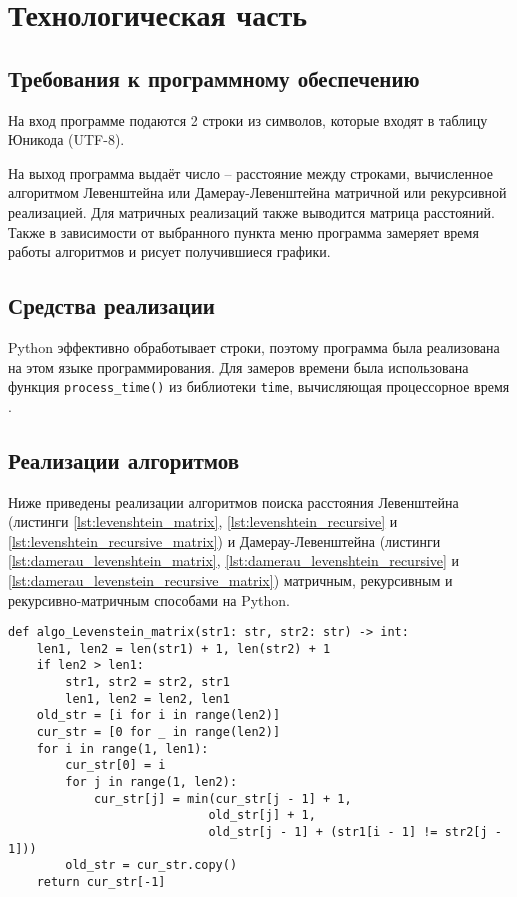 \section{Технологическая часть}
\subsection{Требования к программному обеспечению}

\hspace{1.25cm}
На вход программе подаются 2 строки из символов, которые входят в таблицу Юникода (UTF-8).

На выход программа выдаёт число – расстояние между строками, вычисленное алгоритмом Левенштейна или Дамерау-Левенштейна матричной или рекурсивной реализацией. Для матричных реализаций также выводится матрица расстояний. Также в зависимости от выбранного пункта меню программа замеряет время работы алгоритмов и рисует получившиеся графики.

\subsection{Средства реализации}

\hspace{1.25cm}
Python эффективно обработывает строки, поэтому программа была реализована на этом языке программирования. Для замеров времени была использована функция \texttt{process\_time()} из библиотеки \texttt{time}, вычисляющая процессорное время \cite{process_time}.

\subsection{Реализации алгоритмов}

\hspace{1.25cm}
Ниже приведены реализации алгоритмов поиска расстояния Левенштейна (листинги \ref{lst:levenshtein_matrix}, \ref{lst:levenshtein_recursive} и \ref{lst:levenshtein_recursive_matrix}) и Дамерау-Левенштейна (листинги \ref{lst:damerau_levenshtein_matrix}, \ref{lst:damerau_levenshtein_recursive} и \ref{lst:damerau_levenstein_recursive_matrix}) матричным, рекурсивным и рекурсивно-матричным способами на Python.

\vspace{0.25cm}
\begin{lstlisting}[caption=реализация матричного алгоритма Левенштейна, label=lst:levenshtein_matrix]
def algo_Levenstein_matrix(str1: str, str2: str) -> int:
    len1, len2 = len(str1) + 1, len(str2) + 1
    if len2 > len1:
        str1, str2 = str2, str1
        len1, len2 = len2, len1
    old_str = [i for i in range(len2)]
    cur_str = [0 for _ in range(len2)]
    for i in range(1, len1):
        cur_str[0] = i
        for j in range(1, len2):
            cur_str[j] = min(cur_str[j - 1] + 1,
                            old_str[j] + 1,
                            old_str[j - 1] + (str1[i - 1] != str2[j - 1]))
        old_str = cur_str.copy()
    return cur_str[-1]
\end{lstlisting}


